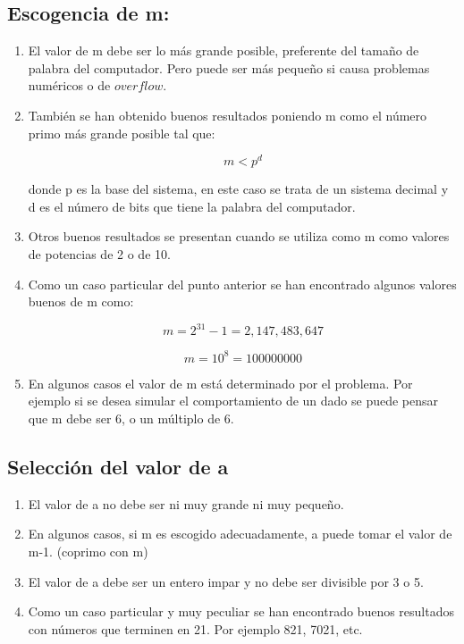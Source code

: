 \subsection{ Escogencia de m:}

\begin{enumerate}

\item El valor de m debe ser lo más grande posible, preferente del tamaño de palabra del computador. Pero puede ser más pequeño si causa problemas numéricos o de $overflow$.

\item También se han obtenido buenos resultados poniendo m como el número primo más grande posible tal que:

$$m < p^d$$

donde p es la base del sistema, en este caso se trata de un sistema decimal y d es el número de bits que tiene la palabra del computador.

\item Otros buenos resultados se presentan cuando se utiliza como m como valores de potencias de 2 o de 10.

\item Como un caso particular del punto anterior se han encontrado algunos valores buenos de m como:

$$m = 2^{31}-1 =  2,147,483,647$$

$$m = 10^{8} =  100000000$$


\item En algunos casos el valor de m está determinado por el problema. Por ejemplo si se desea simular el comportamiento de un dado se puede pensar que m debe ser 6, o un múltiplo de 6.

\end{enumerate}

\subsection{Selección del valor de a}

\begin{enumerate}
\item El valor de a no debe ser ni muy grande ni muy pequeño.

\item En algunos casos, si m es escogido adecuadamente, a puede tomar el valor de m-1. (coprimo con m)

\item El valor de a debe ser un entero impar y no debe ser divisible por 3 o 5.

\item Como un caso particular y muy peculiar se han encontrado buenos resultados con números que terminen en 21. Por ejemplo 821, 7021, etc.
\end{enumerate}

